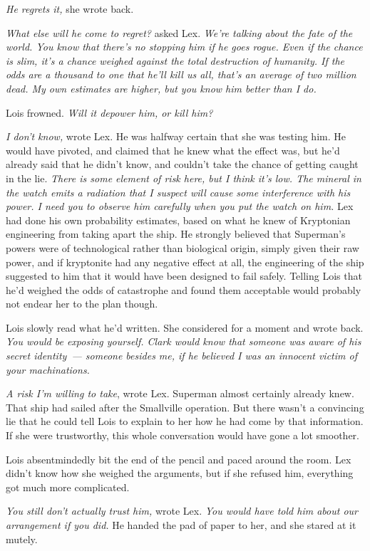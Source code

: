 \emph{He regrets it,} she wrote back.

\emph{What else will he come to regret?} asked Lex. \emph{We're talking
about the fate of the world. You know that there's no stopping him if he
goes rogue. Even if the chance is slim, it's a chance weighed against
the total destruction of humanity. If the odds are a thousand to one
that he'll kill us all, that's an average of two million dead. My own
estimates are higher, but you know him better than I do.}

Lois frowned. \emph{Will it depower him, or kill him?}

\emph{I don't know,} wrote Lex. He was halfway certain that she was
testing him. He would have pivoted, and claimed that he knew what the
effect was, but he'd already said that he didn't know, and couldn't take
the chance of getting caught in the lie. \emph{There is some element of
risk here, but I think it's low. The mineral in the watch emits a
radiation that I suspect will cause some interference with his power. I
need you to observe him carefully when you put the watch on him.} Lex
had done his own probability estimates, based on what he knew of
Kryptonian engineering from taking apart the ship. He strongly believed
that Superman's powers were of technological rather than biological
origin, simply given their raw power, and if kryptonite had any negative
effect at all, the engineering of the ship suggested to him that it
would have been designed to fail safely. Telling Lois that he'd weighed
the odds of catastrophe and found them acceptable would probably not
endear her to the plan though.

Lois slowly read what he'd written. She considered for a moment and
wrote back. \emph{You would be exposing yourself. Clark would know that
someone was aware of his secret identity~--- someone besides me, if he
believed I was an innocent victim of your machinations.}

\emph{A risk I'm willing to take}, wrote Lex. Superman almost certainly
already knew. That ship had sailed after the Smallville operation. But
there wasn't a convincing lie that he could tell Lois to explain to her
how he had come by that information. If she were trustworthy, this whole
conversation would have gone a lot smoother.

Lois absentmindedly bit the end of the pencil and paced around the room.
Lex didn't know how she weighed the arguments, but if she refused him,
everything got much more complicated.

\emph{You still don't actually trust him,} wrote Lex. \emph{You would
have told him about our arrangement if you did.} He handed the pad of
paper to her, and she stared at it mutely.


